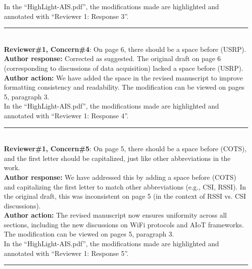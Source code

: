 \documentclass[Afour,sageh,times]{sagej}
\begin{document}
\textcolor{myOrange}{In the “HighLight-AIS.pdf”, the modifications made are highlighted and annotated with “Reviewer 1: Response 3”. }\\

\color{gray}\rule{\linewidth}{1pt}\normalcolor\\

\textcolor{myGreen}{ \textbf{Reviewer\#1, Concern\#4}: On page 6, there should be a space before (USRP).}  \\
 
\textbf{Author response:} Corrected as suggested. The original draft on page 6 (corresponding to discussions of data acquisition) lacked a space before (USRP).\\
\textbf{Author action:} We have added the space in the revised manuscript to improve formatting consistency and readability. The modification can be viewed on pages 5, paragraph 3.\\

\textcolor{myOrange}{In the “HighLight-AIS.pdf”, the modifications made are highlighted and annotated with “Reviewer 1: Response 4”. }\\

\color{gray}\rule{\linewidth}{1pt}\normalcolor\\

\textcolor{myGreen}{ \textbf{Reviewer\#1, Concern\#5}: On page 5, there should be a space before (COTS), and the first letter should be capitalized, just like other abbreviations in the work.}  \\
 
\textbf{Author response:} We have addressed this by adding a space before (COTS) and capitalizing the first letter to match other abbreviations (e.g., CSI, RSSI). In the original draft, this was inconsistent on page 5 (in the context of RSSI vs. CSI discussions).\\
\textbf{Author action:} The revised manuscript now ensures uniformity across all sections, including the new discussions on WiFi protocols and AIoT frameworks. The modification can be viewed on pages 5, paragraph 3.\\

\textcolor{myOrange}{ In the “HighLight-AIS.pdf”, the modifications made are highlighted and annotated with “Reviewer 1: Response 5”. }\\

\color{gray}\rule{\linewidth}{1pt}\normalcolor\\
\end{document}
